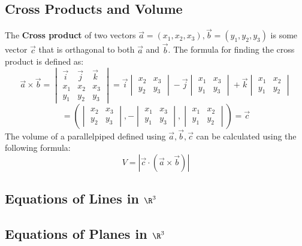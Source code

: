 \documentclass[a4paper]{article}
\begin{document}
  \subsection{Cross Products and Volume}
  The \textbf{Cross product} of two vectors $\vec{a} = (x_1,x_2,x_3),\vec{b}=(y_1,y_2,y_3)$ is some vector $\vec{c}$ that is orthagonal to both $\vec{a}$ and $\vec{b}$. The formula for finding the cross product is defined as:
  \[
    \vec{a} \times \vec{b} = 
    \begin{vmatrix}
      \vec{i} & \vec{j} & \vec{k} \\
      x_1 & x_2 & x_3 \\
      y_1 & y_2 & y_3
    \end{vmatrix} = 
    \vec{i}\begin{vmatrix}
      x_2 & x_3 \\
      y_2 & y_3 
    \end{vmatrix} -
    \vec{j}\begin{vmatrix}
      x_1 & x_3 \\
      y_1 & y_3
    \end{vmatrix} +
    \vec{k}\begin{vmatrix}
      x_1 & x_2 \\
      y_1 & y_2
    \end{vmatrix}
  \]
  \[
    = (\begin{vmatrix}
      x_2 & x_3 \\
      y_2 & y_3 
    \end{vmatrix},
    -\begin{vmatrix}
      x_1 & x_3 \\
      y_1 & y_3
    \end{vmatrix},
    \begin{vmatrix}
      x_1 & x_2 \\
      y_1 & y_2
    \end{vmatrix})
    = \vec{c}
  \]
  The volume of a parallelpiped defined using $\vec{a},\vec{b},\vec{c}$ can be calculated using the following formula:
  \[
    V = |\vec{c} \cdot (\vec{a} \times \vec{b})|
  \]
  \subsection[Equations of Lines]{Equations of Lines in $\R^3$}
  \subsection[Equations of Planes]{Equations of Planes in $\R^3$}
\end{document}
